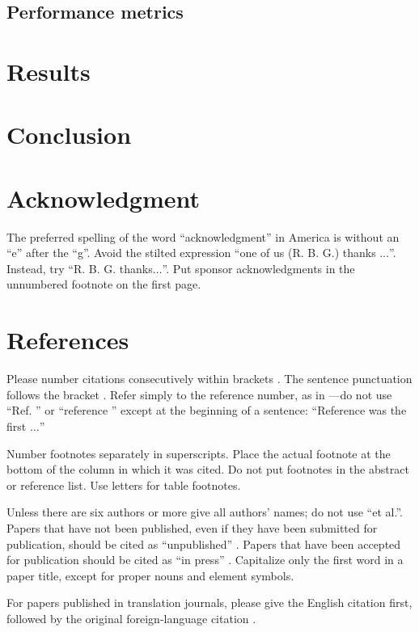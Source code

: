 \documentclass[conference]{IEEEtran}
\begin{document}
\subsection{Performance metrics}

\section{Results}

\section{Conclusion}

\section*{Acknowledgment}

The preferred spelling of the word ``acknowledgment'' in America is without 
an ``e'' after the ``g''. Avoid the stilted expression ``one of us (R. B. 
G.) thanks $\ldots$''. Instead, try ``R. B. G. thanks$\ldots$''. Put sponsor 
acknowledgments in the unnumbered footnote on the first page.

\section*{References}

Please number citations consecutively within brackets \cite{b1}. The 
sentence punctuation follows the bracket \cite{b2}. Refer simply to the reference 
number, as in \cite{b3}---do not use ``Ref. \cite{b3}'' or ``reference \cite{b3}'' except at 
the beginning of a sentence: ``Reference \cite{b3} was the first $\ldots$''

Number footnotes separately in superscripts. Place the actual footnote at 
the bottom of the column in which it was cited. Do not put footnotes in the 
abstract or reference list. Use letters for table footnotes.

Unless there are six authors or more give all authors' names; do not use 
``et al.''. Papers that have not been published, even if they have been 
submitted for publication, should be cited as ``unpublished'' \cite{b4}. Papers 
that have been accepted for publication should be cited as ``in press'' \cite{b5}. 
Capitalize only the first word in a paper title, except for proper nouns and 
element symbols.

For papers published in translation journals, please give the English 
citation first, followed by the original foreign-language citation \cite{b6}.
\end{document}

